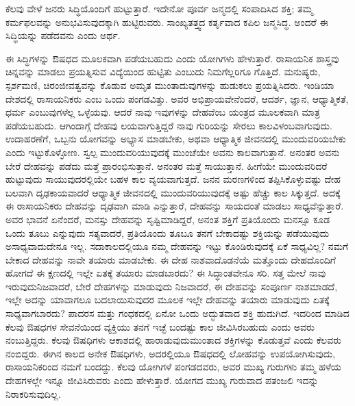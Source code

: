\vspace{0.3cm}

ಕೆಲವು ವೇಳೆ ಜನರು ಸಿದ್ಧಿಯೊಂದಿಗೆ ಹುಟ್ಟುತ್ತಾರೆ. ಇದೇನೋ ಪೂರ್ವ ಜನ್ಮದಲ್ಲಿ ಸಂಪಾದಿಸಿದ ಶಕ್ತಿ; ತಮ್ಮ ಕರ್ಮಫಲವನ್ನು ಅನುಭವಿಸುವುದಕ್ಕಾಗಿ ಹುಟ್ಟಿರುವರು. ಸಾಂಖ್ಯತತ್ತ್ವದ ಕರ್ತೃವಾದ ಕಪಿಲ ಜನ್ಮಸಿದ್ಧ. ಅಂದರೆ ಈ ಸಿದ್ಧಿಯನ್ನು ಪಡೆದವನು ಎಂದು ಅರ್ಥ. 

\vspace{0.3cm}

ಈ ಸಿದ್ಧಿಗಳನ್ನು ಔಷಧದ ಮೂಲಕವಾಗಿ ಪಡೆಯಬಹುದು ಎಂದು ಯೋಗಿಗಳು ಹೇಳುತ್ತಾರೆ. ರಾಸಾಯನಿಕ ಶಾಸ್ತ್ರವು ಚಿನ್ನವನ್ನು ಮಾಡಲು ಪ್ರಯತ್ನಿಸುವ ವಿದ್ಯೆಯಿಂದ ಹುಟ್ಟಿತು ಎಂಬುದು ನಿಮಗೆಲ್ಲರಿಗೂ ಗೊತ್ತಿದೆ. ಮನುಷ್ಯರು, ಸ್ಪರ್ಶಮಣಿ, ಚಿರಂಜೀವತ್ವವನ್ನು ಕೊಡುವ ಅಮೃತ ಮುಂತಾದುವುಗಳನ್ನು ಹುಡುಕಲು ಪ್ರಯತ್ನಿಸಿದರು. ಇಂಡಿಯಾ ದೇಶದಲ್ಲಿ ರಾಸಾಯನಿಕರು ಎಂಬ ಒಂದು ಪಂಗಡವಿತ್ತು. ಅವರ ಅಭಿಪ್ರಾಯವೇನೆಂದರೆ, ಆದರ್ಶ, ಜ್ಞಾನ, ಆಧ್ಯಾತ್ಮಿಕತೆ, ಧರ್ಮ ಎಂಬುವುಗಳೆಲ್ಲ ಒಳ್ಳೆಯವು. ಆದರೆ ನಾವು ಇವುಗಳನ್ನು ದೇಹವೆಂಬ ಯಂತ್ರದ ಮೂಲಕವಾಗಿ ಮಾತ್ರ ಪಡೆಯಬಹುದು. ಆಗಿಂದಾಗ್ಗೆ ದೇಹವು ಲಯವಾಗುತ್ತಿದ್ದರೆ ನಾವು ಗುರಿಯನ್ನು ಸೇರಲು ಕಾಲವಿಳಂಬವಾಗುವುದು. ಉದಾಹರಣೆಗೆ, ಒಬ್ಬನು ಯೋಗವನ್ನು ಅಭ್ಯಾಸ ಮಾಡಬೇಕು, ಅಥವಾ ಆಧ್ಯಾತ್ಮಿಕ ಜೀವನದಲ್ಲಿ ಮುಂದುವರಿಯಬೇಕು ಎಂದು ಇಟ್ಟುಕೊಳ್ಳೋಣ. ಸ್ವಲ್ಪ ಮುಂದುವರಿಯುವುದಕ್ಕೆ ಮುಂಚೆಯೇ ಅವನು ಕಾಲವಾಗುತ್ತಾನೆ. ಅನಂತರ ಅವನು ಬೇರೆ ದೇಹವನ್ನು ಪಡೆದು ಮತ್ತೆ ಪ್ರಾರಂಭಿಸುತ್ತಾನೆ. ಅನಂತರ ಮತ್ತೆ ಸಾಯುತ್ತಾನೆ. ಹೀಗೆಯೇ ಮುಂದುವರಿದರೆ ಹುಟ್ಟುವುದು ಸಾಯುವುದರಲ್ಲಿಯೇ ಬಹಳ ಕಾಲ ವ್ಯಯವಾಗುತ್ತದೆ. ಜನನ ಮರಣಗಳಿಂದ ತಪ್ಪಿಸಿಕೊಳ್ಳುವಷ್ಟು ದೇಹ ಬಲವಾಗಿ ದೃಢಕಾಯವಾದರೆ ಆಧ್ಯಾತ್ಮಿಕ ಜೀವನದಲ್ಲಿ ಮುಂದುವರಿಯುವುದಕ್ಕೆ ಅಷ್ಟು ಹೆಚ್ಚು ಕಾಲ ಸಿಕ್ಕುತ್ತದೆ. ಅದಕ್ಕೆ ಈ ರಾಸಾಯನಿಕರು ದೇಹವನ್ನು ದೃಢವಾಗಿ ಮಾಡಿ ಎನ್ನುತ್ತಾರೆ, ದೇಹವನ್ನು ಸಾಯದಂತೆ ಮಾಡಲು ಸಾಧ್ಯವೆನ್ನುತ್ತಾರೆ. ಅವರ ಭಾವನೆ ಏನೆಂದರೆ, ಮನಸ್ಸು ದೇಹವನ್ನು ಸೃಷ್ಟಿಮಾಡಿದ್ದರೆ, ಅನಂತ ಶಕ್ತಿಗೆ ಪ್ರತಿಯೊಂದು ಮನಸ್ಸೂ ಕೂಡ ಒಂದು ತೂಬು ಎನ್ನುವುದು ಸತ್ಯವಾದರೆ, ಪ್ರತಿಯೊಂದು ತೂಬೂ ತನಗೆ ಬೇಕಾದಷ್ಟು ಶಕ್ತಿಯನ್ನು ಪಡೆಯುವುದು ಅಸಾಧ್ಯವಾದುದೇನೂ ಇಲ್ಲ. ಸದಾಕಾಲದಲ್ಲಿಯೂ ನಮ್ಮ ದೇಹವನ್ನು ಇಟ್ಟು ಕೊಂಡಿರುವುದಕ್ಕೆ ಏಕೆ ಸಾಧ್ಯವಿಲ್ಲ? ನಮಗೆ ಬೇಕಾದ ದೇಹವನ್ನು ನಾವೇ ತಯಾರು ಮಾಡಬೇಕು. ಈ ದೇಹ ನಾಶವಾದೊಡನೆಯೆ ಮತ್ತೊಂದು ದೇಹದೊಂದಿಗೆ ಹೋಗದೆ ಈ ಕ್ಷಣದಲ್ಲಿ ಇಲ್ಲೇ ಏತಕ್ಕೆ ತಯಾರು ಮಾಡಬಾರದು? ಈ ಸಿದ್ಧಾಂತವೇನೂ ಸರಿ. ಸತ್ತ ಮೇಲೆ ನಾವು ಇರುವುದು\break ನಿಜವಾದರೆ, ಬೇರೆ ದೇಹಗಳನ್ನು ಮಾಡುವುದು ನಿಜವಾದರೆ, ಈ ದೇಹವನ್ನು ಸಂಪೂರ್ಣ ನಾಶಮಾಡದೆ, ಇಲ್ಲೇ ಅದನ್ನು ಯಾವಾಗಲೂ ಬದಲಾಯಿಸುವುದರ ಮೂಲಕ ಇಲ್ಲೇ ದೇಹವನ್ನು ತಯಾರು ಮಾಡುವುದು ಏತಕ್ಕೆ ಸಾಧ್ಯವಾಗಬಾರದು? ಪಾದರಸ ಮತ್ತು ಗಂಧಕದಲ್ಲಿ ಏನೋ ಒಂದು ಅದ್ಭುತವಾದ ಶಕ್ತಿ ಹುದುಗಿದೆ. ಇದರಿಂದ ಮಾಡಿದ ಕೆಲವು ಔಷಧಗಳ ಸೇವನೆಯಿಂದ ವ್ಯಕ್ತಿಯು ತನಗೆ ಇಚ್ಛೆ ಬಂದಷ್ಟು ಕಾಲ ಜೀವಿಸಿರಬಹುದು ಎಂದು ಅವರು ನಂಬುತ್ತಿದ್ದರು. ಕೆಲವು ಔಷಧಿಗಳು ಆಕಾಶದಲ್ಲಿ ಹಾರಾಡುವುದು\break ಮುಂತಾದ ಶಕ್ತಿಗಳನ್ನು ಕೊಡುತ್ತವೆ ಎಂದು ಕೆಲವರು ನಂಬಿದ್ದರು. ಈಗಿನ ಕಾಲದ ಅನೇಕ ಔಷಧಿಗಳು, ಅದರಲ್ಲಿಯೂ ಔಷಧದಲ್ಲಿ ಲೋಹವನ್ನು ಉಪಯೋಗಿಸುವುದು, ರಾಸಾಯನಿಕರಿಂದ ನಮಗೆ ಬಂದದ್ದು. ಕೆಲವು ಯೋಗಿಗಳೆ ಪಂಗಡದವರು, ಅವರ ಮುಖ್ಯ ಗುರುಗಳು ತಮ್ಮ ಹಳೆಯ ದೇಹಗಳಲ್ಲೇ ಇನ್ನೂ ಜೀವಿಸಿರುವರು ಎಂದು ಹೇಳುತ್ತಾರೆ. ಯೋಗದ ಮುಖ್ಯ ಗುರುವಾದ ಪತಂಜಲಿ ಇದನ್ನು ನಿರಾಕರಿಸುವುದಿಲ್ಲ. 

